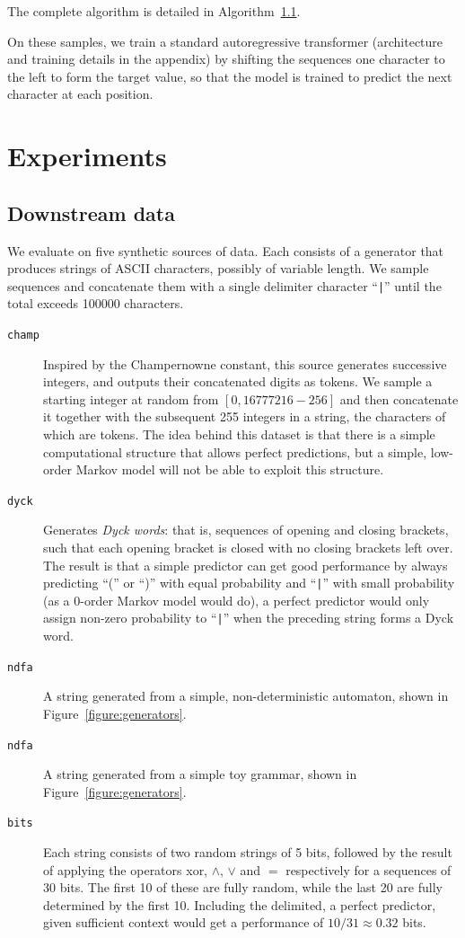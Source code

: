 \documentclass{article} %
\newcommand{\h}[0]{\hspace{0.12em}}
\begin{document}
The complete algorithm is detailed in Algorithm~\ref{}.

On these samples, we train a standard autoregressive transformer (architecture and training details in the appendix) by shifting the sequences one character to the left to form the target value, so that the model is trained to predict the next character at each position.

\section{Experiments}

\subsection{Downstream data}

We evaluate on five synthetic sources of data. Each consists of a generator that produces strings of ASCII characters, possibly of variable length.  We sample sequences and concatenate them with a single delimiter character ``\texttt{|}'' until the total exceeds 100\h000 characters. 
 
\begin{description}
\item[\texttt{champ}] Inspired by the Champernowne constant\footnotemark, this source generates successive integers, and outputs their concatenated digits as tokens. We sample a starting integer at random from $[0, 16777216-256]$ and then concatenate it together with the subsequent 255 integers in a string, the characters of which are tokens. The idea behind this dataset is that there is a simple computational structure that allows perfect predictions, but a simple, low-order Markov model will not be able to exploit this structure.
\item[\texttt{dyck}] Generates \emph{Dyck words}: that is, sequences of opening and closing brackets, such that each opening bracket is closed with no closing brackets left over. The result is that a simple predictor can get good performance by always predicting ``('' or ``)'' with equal probability and ``\texttt{|}'' with small probability (as a $0$-order Markov model would do), a perfect predictor would only assign non-zero probability to ``\texttt{|}'' when the preceding string forms a Dyck word. 
\item[\texttt{ndfa}] A string generated from a simple, non-deterministic automaton, shown in Figure~\ref{figure:generators}.
\item[\texttt{ndfa}] A string generated from a simple toy grammar, shown in Figure~\ref{figure:generators}.
\item[\texttt{bits}] Each string consists of two random strings of 5 bits, followed by the result of applying the operators xor, $\wedge$, $\vee$ and $=$ respectively for a sequences of 30 bits. The first 10 of these are fully random, while the last 20 are fully determined by the   first 10. Including the delimited, a perfect predictor, given sufficient context would get a performance of $10/31 \approx 0.32$ bits.
\end{description}
\end{document}
